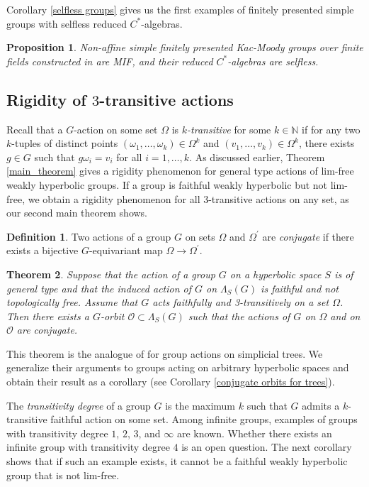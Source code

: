 \documentclass[11pt,letterpaper]{article}
\newcommand{\NN}{\mathbb{N}}
\newtheorem{thmA}{Theorem}[section]
\newtheorem{propA}[thmA]{Proposition}
\theoremstyle{definition}
\newtheorem{defn}[thm]{Definition}
\theoremstyle{remark}
\begin{document}
Corollary \ref{selfless groups} gives us the first examples of finitely presented simple groups with selfless reduced $C^*$-algebras.

\begin{propA}\label{Kac-Moody}
Non-affine simple finitely presented Kac-Moody groups over finite fields constructed in \cite{CR} are MIF, and their reduced $C^*$-algebras are selfless.
\end{propA}

\subsection{Rigidity of $3$-transitive actions}

Recall that a $G$-action on some set $\Omega$ is {\it $k$-transitive} for some $k \in \NN$ if for any two $k$-tuples of distinct points $(\omega_1, \dots, \omega_k) \in \Omega^k$ and  $(v_1, \dots, v_k) \in \Omega^k$, there exists $g \in G$ such that $g\omega_i=v_i$ for all $i=1, \dots, k$.  As discussed earlier, Theorem \ref{main_theorem} gives a rigidity phenomenon for general type actions of lim-free weakly hyperbolic groups. If a group is faithful weakly hyperbolic but not lim-free, we obtain a rigidity phenomenon for all $3$-transitive actions on any set, as our second main theorem shows.  

\begin{defn}
Two actions of a group $G$ on sets $\Omega$ and $\Omega^{\prime}$ are {\it conjugate} if there exists a bijective $G$-equivariant map $\Omega \rightarrow \Omega^{\prime}$.
\end{defn}

\begin{thmA}\label{thm about conjugate orbits}
Suppose that the action of a group $G$ on a hyperbolic space $S$ is of general type and that the induced action of $G$ on $\Lambda_S(G)$ is faithful and not topologically free. 
Assume that $G$ acts faithfully and 3-transitively on a set $\Omega$. Then there exists a $G$-orbit $\mathcal{O} \subset \Lambda_S(G)$ such that the actions of $G$ on $\Omega$ and on $\mathcal{O}$ are conjugate.
\end{thmA}

This theorem is the analogue of \cite[Theorem 1.4]{BM} for group actions on simplicial trees. We generalize their arguments to groups acting on arbitrary hyperbolic spaces and obtain their result as a corollary (see Corollary \ref{conjugate orbits for trees}).  

The {\it transitivity degree} of a group $G$ is the maximum $k$ such that $G$ admits a $k$-transitive faithful action on some set. Among infinite groups, examples of groups with transitivity degree $1$, $2$, $3$, and $\infty$ are known. Whether there exists an infinite group with transitivity degree $4$ is an open question. The next corollary shows that if such an example exists, it cannot be a faithful weakly hyperbolic group that is not lim-free.     
\end{document}
